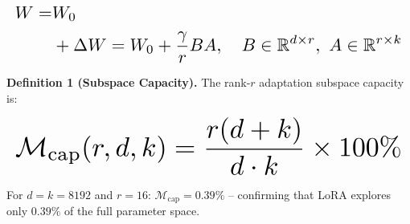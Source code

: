 \documentclass[10pt,twocolumn,letterpaper]{article}
\begin{document}
\begin{equation}
\resizebox{\columnwidth}{!}{$\displaystyle
\begin{aligned}
W = & W_0 \\
& + \Delta W = W_0 + \frac{\gamma}{r}BA, \quad B \in \mathbb{R}^{d \times r},\ A \in \mathbb{R}^{r \times k}
\end{aligned}
$}
\end{equation}

























\textbf{Definition 1 (Subspace Capacity).} The rank-$r$ adaptation subspace capacity is:

























\begin{equation}
\resizebox{\columnwidth}{!}{$\displaystyle
\begin{aligned}
\mathcal{M}_{\text{cap}}(r, d, k) = \frac{r(d + k)}{d \cdot k} \times 100\%
\end{aligned}
$}
\end{equation}

























For $d = k = 8192$ and $r = 16$: $\mathcal{M}_{\text{cap}} = 0.39\%$ -- confirming that LoRA explores only $0.39\%$ of the full parameter space.
\end{document}
